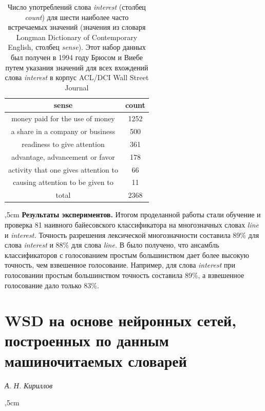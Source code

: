 \documentclass{article}
\begin{document}
\begin{articletext}
\begin{table}[H]
\centering
\caption{Число употреблений слова \textit{interest} (столбец \textit{count}) для шести наиболее часто встречаемых значений (значения из словаря Longman Dictionary of Contemporary English, столбец \textit{sense}). Этот набор данных был получен в 1994 году Брюсом и Виебе \cite{Bruce 1994} путем указания значений для всех вхождений слова \textit{interest} в корпус ACL/DCI Wall Street Journal}
\begin{tabular}{|c|c|}
\hline
sense & count\\
\hline
money paid for the use of money & 1252\\
a share in a company or business & 500\\
readiness to give attention & 361\\
advantage, advancement or favor & 178\\
activity that one gives attention to & 66\\
causing attention to be given to & 11\\
\hline
total & 2368\\
\hline
\end{tabular}
\label{tbl4}
\end{table}


,5cm
\textbf{Результаты экспериментов.} Итогом проделанной работы стали обучение и проверка 81 наивного байесовского классификатора на многозначных словах \textit{line} и \textit{interest.} Точность разрешения лексической многозначности составила 89\% для слова \textit{interest} и 88\% для слова \textit{line.} В \cite{Pedersen 2000} было получено, что ансамбль классификаторов с голосованием простым большинством дает более высокую точность, чем взвешенное голосование. Например, для слова \textit{interest} при голосовании простым большинством точность составила 89\%, а взвешенное голосование дало только 83\%.



\bfullwidth
\section{WSD на основе нейронных сетей, построенных по данным машиночитаемых словарей}
\efullwidth

\begin{flushright}
\textit{А. Н. Кириллов}
\end{flushright}

,5cm


\end{articletext}
\end{document}
